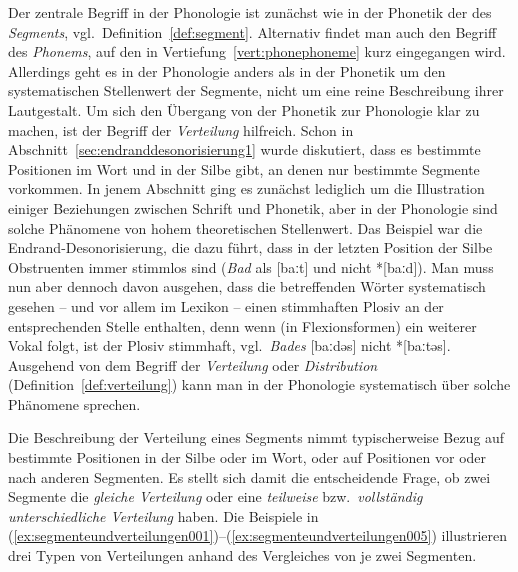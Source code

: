 Der zentrale Begriff in der Phonologie ist zunächst wie in der Phonetik der des \textit{Segments}, vgl.\ Definition~\ref{def:segment}.
Alternativ findet man auch den Begriff des \textit{Phonems}, auf den in Vertiefung~\ref{vert:phonephoneme} kurz eingegangen wird.
Allerdings geht es in der Phonologie anders als in der Phonetik um den systematischen Stellenwert der Segmente, nicht um eine reine Beschreibung ihrer Lautgestalt.
Um sich den Übergang von der Phonetik zur Phonologie klar zu machen, ist der Begriff der \textit{Verteilung} hilfreich.
Schon in Abschnitt~\ref{sec:endranddesonorisierung1} wurde diskutiert, dass es bestimmte Positionen im Wort und in der Silbe gibt, an denen nur bestimmte Segmente vorkommen.
In jenem Abschnitt ging es zunächst lediglich um die Illustration einiger Beziehungen zwischen Schrift und Phonetik, aber in der Phonologie sind solche Phänomene von hohem theoretischen Stellenwert.
Das Beispiel war die Endrand-Desonorisierung, die dazu führt, dass in der letzten Position der Silbe Obstruenten immer stimmlos sind (\textit{Bad} als [baːt] und nicht *[baːd]).
Man muss nun aber dennoch davon ausgehen, dass die betreffenden Wörter systematisch gesehen -- und vor allem im Lexikon -- einen stimmhaften Plosiv an der entsprechenden Stelle enthalten, denn wenn (\zB in Flexionsformen) ein weiterer Vokal folgt, ist der Plosiv stimmhaft, vgl.\ \textit{Bades} [baːdəs] nicht *[baːtəs].
Ausgehend von dem Begriff der \textit{Verteilung} oder \textit{Distribution} (Definition~\ref{def:verteilung}) kann man in der Phonologie systematisch über solche Phänomene sprechen.


\Stretch

Die Beschreibung der Verteilung eines Segments nimmt typischerweise Bezug auf bestimmte Positionen in der Silbe oder im Wort, oder auf Positionen vor oder nach anderen Segmenten.
Es stellt sich damit die entscheidende Frage, ob zwei Segmente die \textit{gleiche Verteilung} oder eine \textit{teilweise} bzw.\ \textit{vollständig unterschiedliche Verteilung} haben.
Die Beispiele in (\ref{ex:segmenteundverteilungen001})--(\ref{ex:segmenteundverteilungen005}) illustrieren drei Typen von Verteilungen anhand des Vergleiches von je zwei Segmenten.

\Stretch[0.5]

